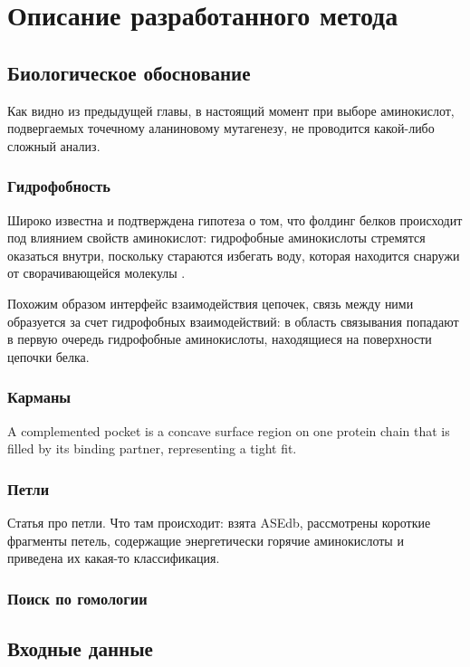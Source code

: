 \graphicspath{{../images/algorithm/}}
\chapter{Описание разработанного метода}

\section{Биологическое обоснование}
Как видно из предыдущей главы,  в настоящий момент при выборе аминокислот, подвергаемых точечному аланиновому мутагенезу, не проводится какой-либо сложный анализ.


\subsection{Гидрофобность}
Широко известна и подтверждена гипотеза о том, что фолдинг белков происходит под влиянием свойств аминокислот: гидрофобные аминокислоты стремятся оказаться внутри, поскольку стараются избегать воду, которая находится снаружи от сворачивающейся молекулы \cite{hydrophoby}.

Похожим образом интерфейс взаимодействия цепочек, связь между ними образуется за счет гидрофобных взаимодействий: в область связывания попадают в первую очередь гидрофобные аминокислоты, находящиеся на поверхности цепочки белка.

\subsection{Карманы}
A complemented pocket is a concave surface
region on one protein chain that is filled by its
binding partner, representing a tight fit.
\cite{pockets2004}
\subsection{Петли}

Статья про петли\cite{loops2014}. Что там происходит: взята ASEdb, рассмотрены короткие фрагменты петель, содержащие энергетически горячие аминокислоты и приведена их какая-то классификация.
\subsection{Поиск по гомологии}
\section{Входные данные}


